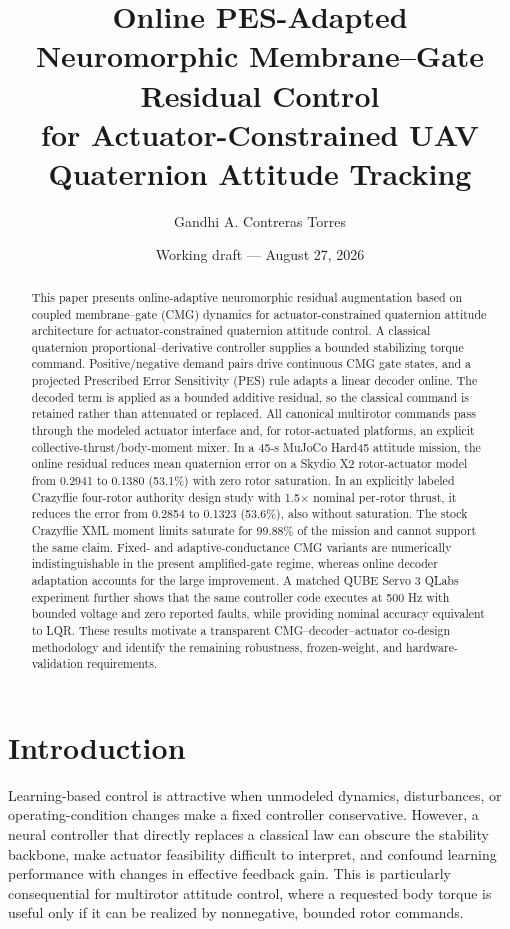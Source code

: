 \documentclass[10pt,twocolumn]{article}
\title{\textbf{Online PES-Adapted Neuromorphic Membrane--Gate Residual Control\\
for Actuator-Constrained UAV Quaternion Attitude Tracking}}
\author{Gandhi A. Contreras Torres}
\date{Working draft --- August 27, 2026}
\begin{document}
\maketitle

\begin{abstract}
This paper presents online-adaptive neuromorphic residual augmentation based on
coupled membrane--gate (CMG) dynamics for actuator-constrained quaternion attitude
architecture for actuator-constrained quaternion attitude control. A classical
quaternion proportional--derivative controller supplies a bounded stabilizing
torque command. Positive/negative demand pairs drive continuous CMG gate
states, and a projected Prescribed Error Sensitivity (PES) rule adapts a linear
decoder online. The decoded term is applied as a bounded additive residual, so
the classical command is retained rather than attenuated or replaced. All
canonical multirotor commands pass through the modeled actuator interface and,
for rotor-actuated platforms, an explicit collective-thrust/body-moment mixer.
In a 45-s MuJoCo Hard45 attitude mission, the online residual reduces mean
quaternion error on a Skydio X2 rotor-actuator model from 0.2941 to 0.1380
(53.1\%) with zero rotor saturation. In an explicitly labeled Crazyflie
four-rotor authority design study with 1.5$\times$ nominal per-rotor thrust, it
reduces the error from 0.2854 to 0.1323 (53.6\%), also without saturation. The
stock Crazyflie XML moment limits saturate for 99.88\% of the mission and cannot
support the same claim. Fixed- and adaptive-conductance CMG variants are
numerically indistinguishable in the present amplified-gate regime, whereas
online decoder adaptation accounts for the large improvement. A matched QUBE
Servo 3 QLabs experiment further shows that the same controller code executes
at 500 Hz with bounded voltage and zero reported faults, while providing
nominal accuracy equivalent to LQR. These results motivate a transparent
CMG--decoder--actuator co-design methodology and identify the
remaining robustness, frozen-weight, and hardware-validation requirements.
\end{abstract}

\section{Introduction}

Learning-based control is attractive when unmodeled dynamics, disturbances, or
operating-condition changes make a fixed controller conservative. However, a
neural controller that directly replaces a classical law can obscure the
stability backbone, make actuator feasibility difficult to interpret, and
confound learning performance with changes in effective feedback gain. This is
particularly consequential for multirotor attitude control, where a requested
body torque is useful only if it can be realized by nonnegative, bounded rotor
commands.
\end{document}
